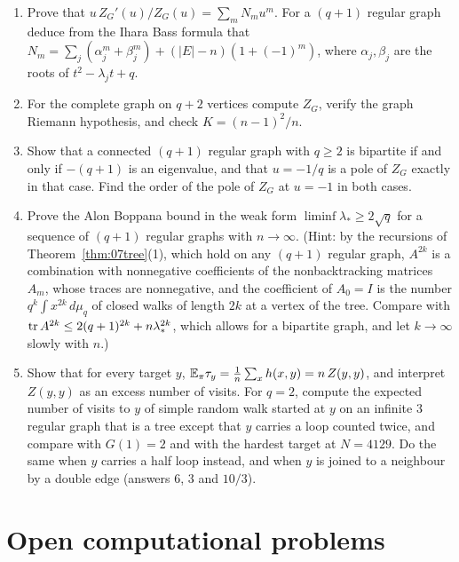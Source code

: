 \begin{enumerate}
\item Prove that $u\,Z_G'(u)/Z_G(u)=\sum_mN_mu^m$. For a $(q+1)$ regular graph deduce from the Ihara Bass formula that $N_m=\sum_j(\alpha_j^m+\beta_j^m)+(|E|-n)(1+(-1)^m)$, where $\alpha_j,\beta_j$ are the roots of $t^2-\lambda_jt+q$.
\item For the complete graph on $q+2$ vertices compute $Z_G$, verify the graph Riemann hypothesis, and check $K=(n-1)^2/n$.
\item Show that a connected $(q+1)$ regular graph with $q\ge2$ is bipartite if and only if $-(q+1)$ is an eigenvalue, and that $u=-1/q$ is a pole of $Z_G$ exactly in that case. Find the order of the pole of $Z_G$ at $u=-1$ in both cases.
\item\label{ex:08alon} Prove the Alon Boppana bound in the weak form $\liminf\lambda_*\ge2\sqrt q$ for a sequence of $(q+1)$ regular graphs with $n\to\infty$. (Hint: by the recursions of Theorem~\ref{thm:07tree}(1), which hold on any $(q+1)$ regular graph, $A^{2k}$ is a combination with nonnegative coefficients of the nonbacktracking matrices $A_m$, whose traces are nonnegative, and the coefficient of $A_0=I$ is the number $q^k\int x^{2k}\,d\mu_q$ of closed walks of length $2k$ at a vertex of the tree. Compare with $\operatorname{tr} A^{2k}\le2(q+1)^{2k}+n\lambda_*^{2k}$, which allows for a bipartite graph, and let $k\to\infty$ slowly with $n$.)
\item\label{ex:08target} Show that for every target $y$, $\mathbb{E}_\pi\tau_y=\frac1n\sum_xh(x,y)=n\,Z(y,y)$, and interpret $Z(y,y)$ as an excess number of visits. For $q=2$, compute the expected number of visits to $y$ of simple random walk started at $y$ on an infinite $3$ regular graph that is a tree except that $y$ carries a loop counted twice, and compare with $G(1)=2$ and with the hardest target at $N=4129$. Do the same when $y$ carries a half loop instead, and when $y$ is joined to a neighbour by a double edge (answers $6$, $3$ and $10/3$).
\end{enumerate}

\section{Open computational problems}

